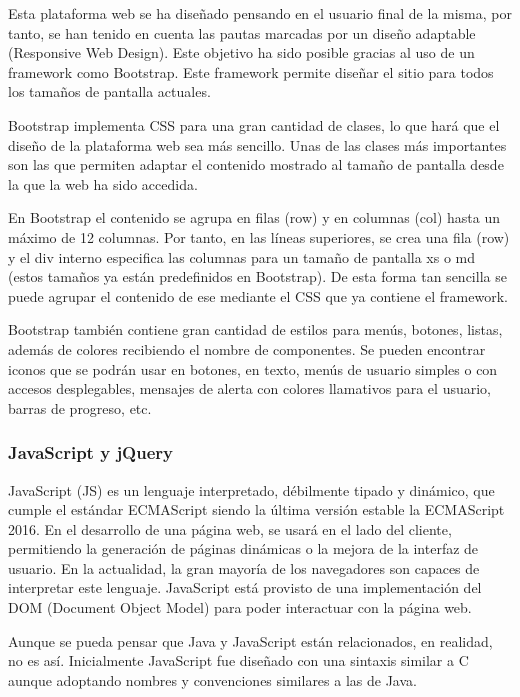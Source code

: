 Esta plataforma web se ha diseñado pensando en el usuario final de la misma, por tanto, se han tenido en cuenta las pautas marcadas por un diseño adaptable (Responsive Web Design). Este objetivo ha sido posible gracias al uso de un framework como Bootstrap. Este framework permite diseñar el sitio para todos los tamaños de pantalla actuales.

Bootstrap implementa CSS para una gran cantidad de clases, lo que hará que el diseño de la plataforma web sea más sencillo. Unas de las clases más importantes son las que permiten adaptar el contenido mostrado al tamaño de pantalla desde la que la web ha sido accedida.

En Bootstrap el contenido se agrupa en filas (row) y en columnas (col) hasta un máximo de 12 columnas. Por tanto, en las líneas superiores, se crea una fila (row) y el div interno especifica las columnas para un tamaño de pantalla xs o md (estos tamaños ya están predefinidos en Bootstrap). De esta forma tan sencilla se puede agrupar el contenido de ese  mediante el CSS que ya contiene el framework. 

Bootstrap también contiene gran cantidad de estilos para menús, botones, listas, además de colores recibiendo el nombre de componentes. Se pueden encontrar iconos que se podrán usar en botones, en texto, menús de usuario simples o con accesos desplegables, mensajes de alerta con colores llamativos para el usuario, barras de progreso, etc.

\subsubsection{JavaScript y jQuery}

JavaScript (JS) es un lenguaje interpretado, débilmente tipado y dinámico, que cumple el estándar ECMAScript siendo la última versión estable la ECMAScript 2016. En el desarrollo de una página web, se usará en el lado del cliente, permitiendo la generación de páginas dinámicas o la mejora de la interfaz de usuario. En la actualidad, la gran mayoría de los navegadores son capaces de interpretar este lenguaje. JavaScript está provisto de una implementación del DOM (Document Object Model) para poder interactuar con la página web.

Aunque se pueda pensar que Java y JavaScript están relacionados, en realidad, no es así. Inicialmente JavaScript fue diseñado con una sintaxis similar a C aunque adoptando nombres y convenciones similares a las de Java.

